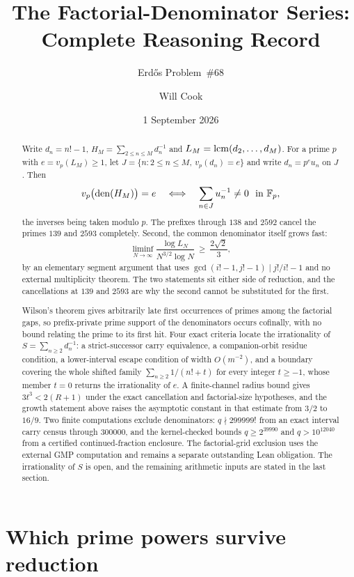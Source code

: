 \documentclass[11pt]{article}
\title{The Factorial-Denominator Series: Complete Reasoning Record}
\subtitle{Erd\H{o}s Problem~\#68}
\author{Will Cook}
\date{1 September 2026}
\newcommand{\Ser}{S}
\newcommand{\Lc}{L}
\newcommand{\den}{\operatorname{den}}
\begin{document}
\maketitle
\noteprovenance

\begin{abstract}
\noindent
Write $d_n=n!-1$, $H_M=\sum_{2\le n\le M}d_n^{-1}$ and
$\Lc_M=\lcm(d_2,\ldots,d_M)$.  For a prime $p$ with $e=v_p(\Lc_M)\ge1$, let
$J=\{n:2\le n\le M,\ v_p(d_n)=e\}$ and write $d_n=p^eu_n$ on $J$.  Then
\[
 v_p\bigl(\den(H_M)\bigr)=e
 \quad\Longleftrightarrow\quad
 \sum_{n\in J}u_n^{-1}\ne0\ \hbox{ in }\mathbb F_p,
\]
the inverses being taken modulo $p$.  The prefixes through $138$ and $2592$
cancel the primes $139$ and $2593$ completely.  Second, the common
denominator itself grows fast:
\[
 \liminf_{N\to\infty}\frac{\log \Lc_N}{N^{3/2}\log N}\ \ge\ \frac{2\sqrt2}{3},
\]
by an elementary segment argument that uses
$\gcd(i!-1,j!-1)\mid j!/i!-1$ and no external multiplicity theorem.  The two
statements sit either side of reduction, and the cancellations at $139$ and
$2593$ are why the second cannot be substituted for the first.

Wilson's theorem gives arbitrarily late first occurrences of primes among the
factorial gaps, so prefix-private prime support of the denominators occurs
cofinally, with no bound relating the prime to its first hit.  Four exact
criteria locate the irrationality of $\Ser=\sum_{n\ge2}d_n^{-1}$: a
strict-successor carry equivalence, a companion-orbit residue condition, a
lower-interval escape condition of width $O(m^{-2})$, and a boundary covering
the whole shifted family $\sum_{n\ge2}1/(n!+t)$ for every integer $t\ge-1$,
whose member $t=0$ returns the irrationality of $e$.  A finite-channel radius
bound gives $3t^3<2(R+1)$ under the exact cancellation and factorial-size
hypotheses, and the growth statement above raises the asymptotic constant in
that estimate from $3/2$ to $16/9$.  Two finite computations exclude
denominators: $q\nmid299999!$ from an exact interval carry census through
$300000$, and the kernel-checked bounds $q\ge2^{39990}$ and
$q>10^{12040}$ from a certified continued-fraction enclosure. The
factorial-grid exclusion uses the external GMP computation and remains a
separate outstanding Lean obligation.  The irrationality of $\Ser$ is open, and the remaining
arithmetic inputs are stated in the last section.
\end{abstract}

\section{Which prime powers survive reduction}\label{long68:sec:prime-powers}
\end{document}
